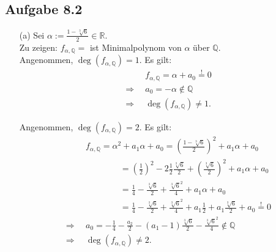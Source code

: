 \documentclass[12pt]{article}
\newcommand{\df}{\enspace\Longrightarrow\enspace}
\newcommand{\grad}{\operatorname{deg}}
\begin{document}
\subsection*{Aufgabe 8.2}
\begin{enumerate}
	\item[(a)] Sei $\alpha:=\frac{1-\sqrt[3]{6}}{2}\in\mathbb{R}$. \\
	Zu zeigen: $f_{\alpha,\mathbb{Q}}=$ ist Minimalpolynom von $\alpha$ über $\mathbb{Q}$. \\
	Angenommen, $\grad(f_{\alpha,\mathbb{Q}})=1$. Es gilt:
	\begin{align*}
		&f_{\alpha,\mathbb{Q}}=\alpha+a_0\overset{!}{=}0 \\
		\df&a_0=-\alpha\notin\mathbb{Q} \\
		\df&\grad(f_{\alpha,\mathbb{Q}})\neq1.
	\end{align*}
	
	Angenommen, $\grad(f_{\alpha,\mathbb{Q}})=2$. Es gilt:
	\begin{align*}
		&f_{\alpha,\mathbb{Q}}=\alpha^2+a_1\alpha+a_0=\left(\frac{1-\sqrt[3]{6}}{2}\right)^2+a_1\alpha+a_0 \\
		&\quad\quad\quad\quad=\left(\frac{1}{2}\right)^2-2\frac{1}{2}\frac{\sqrt[3]{6}}{2}+\left(\frac{\sqrt[3]{6}}{2}\right)^2+a_1\alpha+a_0 \\
		&\quad\quad\quad\quad=\frac{1}{4}-\frac{\sqrt[3]{6}}{2}+\frac{\sqrt[3]{6}^2}{4}+a_1\alpha+a_0 \\
		&\quad\quad\quad\quad=\frac{1}{4}-\frac{\sqrt[3]{6}}{2}+\frac{\sqrt[3]{6}^2}{4}+a_1\frac{1}{2}+a_1\frac{\sqrt[3]{6}}{2}+a_0\overset{!}{=}0 \\
		\df&a_0=-\frac{1}{4}-\frac{a_2}{2}-(a_1-1)\frac{\sqrt[3]{6}}{2}-\frac{\sqrt[3]{6}^2}{4}\notin\mathbb{Q} \\
		\df&\grad(f_{\alpha,\mathbb{Q}})\neq2.
	\end{align*}
	

\end{enumerate}
\end{document}
